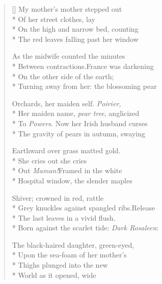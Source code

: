 \label{ch:halifax}
\settowidth{\versewidth}{Between contractions.\quad France was darkening}
\begin{verse}[\versewidth]
My mother's mother stepped out\\*
Of her street clothes, lay\\*
On the high and narrow bed, counting\\*
The red leaves falling past her window

As the midwife counted the minutes\\*
Between contractions.\quad France was darkening\\*
On the other side of the earth;\\*
Turning away from her: the blossoming pear

Orchards, her maiden self. \textit{Poirier,}\\*
Her maiden name, \textit{pear tree}, anglicized\\*
To \textit{Powers}. Now her Irish husband curses\\*
The gravity of pears in autumn, swaying

Earthward over grass matted gold.\\*
She cries out she cries\\*
Out \textit{Maman!}\quad  Framed in the white\\*
Hospital window, the slender maples

Shiver; crowned in red, rattle\\*
Grey knuckles against spangled ribs.\quad Release\\*
The last leaves in a vivid flush.\\*
Born against the scarlet tide: \textit{Dark Rosaleen}:

The black-haired daughter, green-eyed,\\*
Upon the sea-foam of her mother's\\*
Thighs plunged into the new\\*
World as it opened, wide
\end{verse}


